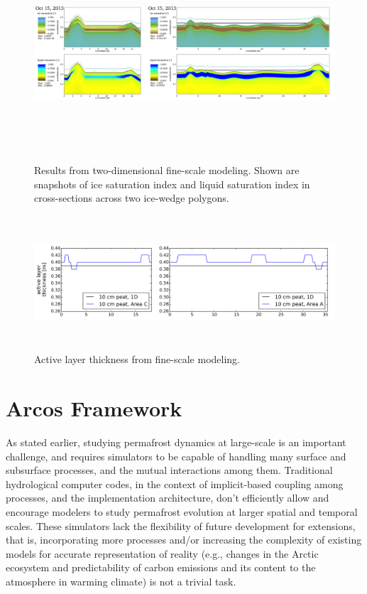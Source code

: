 \documentclass[review]{elsarticle}
\begin{document}
\begin{figure}
\centering
\includegraphics[height=8cm,width=17cm]{figures/FineScaleOct15.png}
\caption{Results from two-dimensional fine-scale modeling. Shown are snapshots of ice saturation index and liquid saturation index in cross-sections across two ice-wedge polygons.}
\label{oct15}
\end{figure}

\begin{figure}[!htpb]
\centering
\includegraphics[height=5cm, width=12cm]{figures/ALT-finescale.png}
\caption{Active layer thickness from fine-scale modeling.}
\label{alt}
\end{figure}

\section{Arcos Framework}\label{arcos-framework}

As stated earlier, studying permafrost dynamics at large-scale is an important challenge, and requires simulators to be capable of handling many surface and subsurface processes, and the mutual interactions among them. Traditional hydrological computer codes, in the context of implicit-based coupling among processes, and the implementation architecture, don't efficiently allow and encourage modelers to study permafrost evolution at larger spatial and temporal scales. These simulators lack the flexibility of future development for extensions, that is, incorporating more processes and/or increasing the complexity of existing models for accurate representation of reality (e.g., changes in the Arctic ecosystem and predictability of carbon emissions and its content to the atmosphere in warming climate) is not a trivial task.
\end{document}

